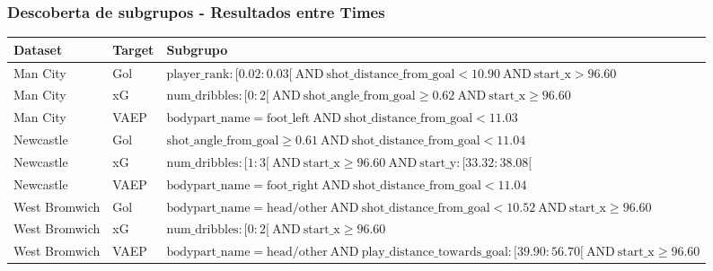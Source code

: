 \documentclass{beamer}
\begin{document}
\begin{frame}
\frametitle{Descoberta de subgrupos - Resultados entre Times}
    \begin{table}[H]
        \centering
        \fontsize{6}{10}\selectfont %
        \begin{tabularx}{\textwidth}{|l|l|X|}
            \hline
            \textbf{Dataset} & \textbf{Target} & \textbf{Subgrupo} \\
            \hline
            Man City & Gol & $ \text{player\_rank} : [0.02:0.03[ \ \text{AND} \ \text{shot\_distance\_from\_goal} < 10.90 \ \text{AND} \ \text{start\_x} > 96.60 $ \\
            \hline
            Man City & xG & $ \text{num\_dribbles} : [0:2[ \ \text{AND} \ \text{shot\_angle\_from\_goal} \geq 0.62 \ \text{AND} \ \text{start\_x} \geq 96.60 $ \\
            \hline
            Man City & VAEP & $ \text{bodypart\_name} = \text{foot\_left} \ \text{AND} \ \text{shot\_distance\_from\_goal} < 11.03 $ \\
            \hline
            Newcastle & Gol & $ \text{shot\_angle\_from\_goal} \geq 0.61 \ \text{AND} \ \text{shot\_distance\_from\_goal} < 11.04 $ \\
            \hline
            Newcastle & xG & $ \text{num\_dribbles} : [1:3[ \ \text{AND} \ \text{start\_x} \geq 96.60 \ \text{AND} \ \text{start\_y} : [33.32:38.08[ $ \\
            \hline
            Newcastle & VAEP & $ \text{bodypart\_name} = \text{foot\_right} \ \text{AND} \ \text{shot\_distance\_from\_goal} < 11.04 $ \\
            \hline
            West Bromwich & Gol & $ \text{bodypart\_name} = \text{head/other} \ \text{AND} \ \text{shot\_distance\_from\_goal} < 10.52 \ \text{AND} \ \text{start\_x} \geq 96.60 $ \\
            \hline
            West Bromwich & xG & $ \text{num\_dribbles} : [0:2[ \ \text{AND} \ \text{start\_x} \geq 96.60 $ \\
            \hline
            West Bromwich & VAEP & $ \text{bodypart\_name} = \text{head/other} \ \text{AND} \ \text{play\_distance\_towards\_goal} : [39.90:56.70[ \ \text{AND} \ \text{start\_x} \geq 96.60 $ \\
            \hline
        \end{tabularx}
    \end{table}
\end{frame}
\end{document}
